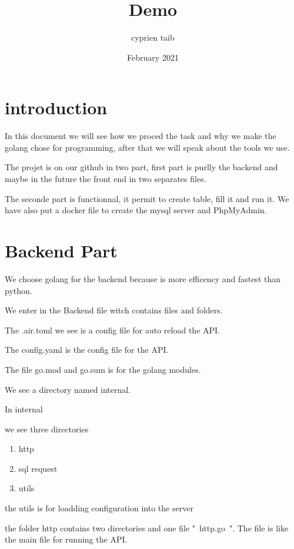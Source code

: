 \documentclass{article}
\title{Demo}
\author{cyprien taib}
\date{February 2021}
\begin{document}
    \maketitle
    \section{introduction}
        
    In this document we will see how we proced the task and why we make the golang chose for programming, after that we will speak about the tools we use.


    The projet is on our github in two part, first part is purlly the backend and maybe in the future the front end in two separates files. \newline\newline

    The seconde part is functionnal, it permit to create table, fill it and run it. We have also put a docker file to create the mysql server and PhpMyAdmin.
   
    
    \section{Backend Part}

    We choose golang for the backend because is more efficency and fastest than python. 

    We enter in the Backend file witch contains files and folders.

    The .air.toml we see is a config file for auto reload the API.

    The config.yaml is the config file for the API.

    The file go.mod and go.sum is for the golang modules.

    We see a directory named internal.

        In internal

    we see three directories
        \begin{enumerate}
            \item http
            \item sql request
            \item utils
        \end{enumerate}

    the utils is for loadding configuration into the server \newline\newline

    the folder http contains two directories and one file " http.go ". The file is like the main file for running the API.  
\end{document}
